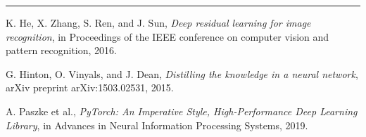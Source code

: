 \documentclass[12pt,a4paper]{article}
\begin{document}
\newpage
\hrule
\vspace{0.5cm}
\begin{thebibliography}{9}
    K. He, X. Zhang, S. Ren, and J. Sun,
    \textit{Deep residual learning for image recognition},
    in Proceedings of the IEEE conference on computer vision and pattern recognition, 2016.

    G. Hinton, O. Vinyals, and J. Dean,
    \textit{Distilling the knowledge in a neural network},
    arXiv preprint arXiv:1503.02531, 2015.

    A. Paszke et al.,
    \textit{PyTorch: An Imperative Style, High-Performance Deep Learning Library},
    in Advances in Neural Information Processing Systems, 2019.

\end{thebibliography}
\end{document}

